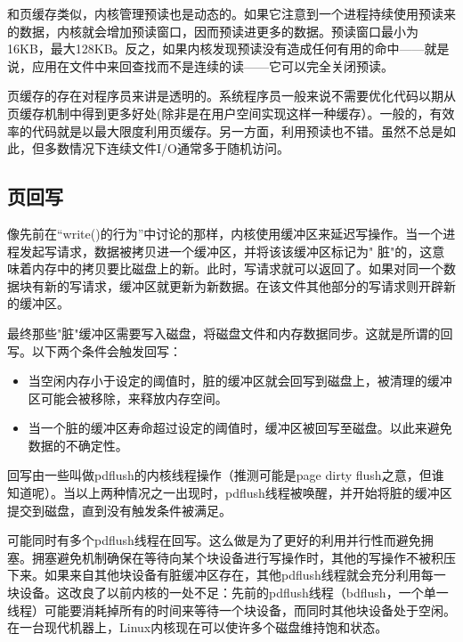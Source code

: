 和页缓存类似，内核管理预读也是动态的。如果它注意到一个进程持续使用预读来的数据，内核就会增加预读窗口，因而预读进更多的数据。预读窗口最小为16KB，最大128KB。反之，如果内核发现预读没有造成任何有用的命中——就是说，应用在文件中来回查找而不是连续的读——它可以完全关闭预读。

页缓存的存在对程序员来讲是透明的。系统程序员一般来说不需要优化代码以期从页缓存机制中得到更多好处(除非是在用户空间实现这样一种缓存）。一般的，有效率的代码就是以最大限度利用页缓存。另一方面，利用预读也不错。虽然不总是如此，但多数情况下连续文件I/O通常多于随机访问。 

\subsection{页回写}

像先前在“write()的行为”中讨论的那样，内核使用缓冲区来延迟写操作。当一个进程发起写请求，数据被拷贝进一个缓冲区，并将该该缓冲区标记为" 脏"的，这意味着内存中的拷贝要比磁盘上的新。此时，写请求就可以返回了。如果对同一个数据块有新的写请求，缓冲区就更新为新数据。在该文件其他部分的写请求则开辟新的缓冲区。 

最终那些"脏"缓冲区需要写入磁盘，将磁盘文件和内存数据同步。这就是所谓的回写。以下两个条件会触发回写： 

\begin{itemize}
\item \begin{flushleft}当空闲内存小于设定的阈值时，脏的缓冲区就会回写到磁盘上，被清理的缓冲区可能会被移除，来释放内存空间。\end{flushleft}
\item \begin{flushleft}当一个脏的缓冲区寿命超过设定的阈值时，缓冲区被回写至磁盘。以此来避免数据的不确定性。 \end{flushleft}
\end{itemize}

回写由一些叫做pdflush的内核线程操作（推测可能是page dirty flush之意，但谁知道呢）。当以上两种情况之一出现时，pdflush线程被唤醒，并开始将脏的缓冲区提交到磁盘，直到没有触发条件被满足。

可能同时有多个pdflush线程在回写。这么做是为了更好的利用并行性而避免拥塞。拥塞避免机制确保在等待向某个块设备进行写操作时，其他的写操作不被积压下来。如果来自其他块设备有脏缓冲区存在，其他pdflush线程就会充分利用每一块设备。这改良了以前内核的一处不足：先前的pdflush线程（bdflush，一个单一线程）可能要消耗掉所有的时间来等待一个块设备，而同时其他块设备处于空闲。在一台现代机器上，Linux内核现在可以使许多个磁盘维持饱和状态。


